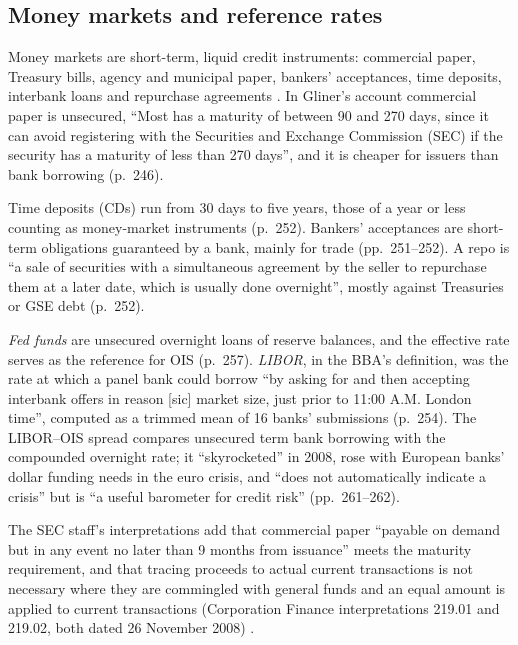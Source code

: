 \subsection{Money markets and reference rates}

\begin{qfdefinition}\label{def:money-market-reference-rates}
 Money markets are short-term, liquid credit instruments: commercial paper, Treasury bills, agency and municipal paper, bankers' acceptances, time deposits, interbank loans and repurchase agreements \citep[chap.~9, sec.\ ``Funding/Money Markets'', PDF pp.~246--253]{s7-gliner}. In Gliner's account commercial paper is unsecured, ``Most has a maturity of between 90 and 270 days, since it can avoid registering with the Securities and Exchange Commission (SEC) if the security has a maturity of less than 270 days'', and it is cheaper for issuers than bank borrowing (p.~246).

Time deposits (CDs) run from 30 days to five years, those of a year or less counting as money-market instruments (p.~252). Bankers' acceptances are short-term obligations guaranteed by a bank, mainly for trade (pp.~251--252). A repo is ``a sale of securities with a simultaneous agreement by the seller to repurchase them at a later date, which is usually done overnight'', mostly against Treasuries or GSE debt (p.~252).

\emph{Fed funds} are unsecured overnight loans of reserve balances, and the effective rate serves as the reference for OIS (p.~257). \emph{LIBOR}, in the BBA's definition, was the rate at which a panel bank could borrow ``by asking for and then accepting interbank offers in reason [sic] market size, just prior to 11:00 A.M. London time'', computed as a trimmed mean of 16 banks' submissions (p.~254). The LIBOR--OIS spread compares unsecured term bank borrowing with the compounded overnight rate; it ``skyrocketed'' in 2008, rose with European banks' dollar funding needs in the euro crisis, and ``does not automatically indicate a crisis'' but is ``a useful barometer for credit risk'' (pp.~261--262).

The SEC staff's interpretations add that commercial paper ``payable on demand but in any event no later than 9 months from issuance'' meets the maturity requirement, and that tracing proceeds to actual current transactions is not necessary where they are commingled with general funds and an equal amount is applied to current transactions (Corporation Finance interpretations 219.01 and 219.02, both dated 26 November 2008) \citep[Securities Act Sections, 219.01--219.02, page updated 23 June 2026]{sec-cdi-securities-act}.


\end{qfdefinition}
